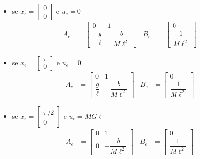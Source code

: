 \documentclass{article}
\numberwithin{equation}{subsection}
\begin{document}
\begin{itemize}
    \item se $x_e = \begin{bmatrix} 0\\0 \end{bmatrix}$ e $u_e = 0$
    \begin{align*}
        A_e &= 
        \begin{bmatrix}
            0 & 1\\
            -\dfrac{g}{\ell} & -\dfrac{b}{M \ell^2}
        \end{bmatrix} 
        &
        B_e &=
        \begin{bmatrix}
            0\\
            \dfrac{1}{M \ell^2}
        \end{bmatrix}
    \end{align*}
    \item se $x_e=\begin{bmatrix} \pi\\0 \end{bmatrix}$ e $u_e=0$
    \begin{align*}
        A_e &= 
        \begin{bmatrix}
            0 & 1\\
            \dfrac{g}{\ell} & -\dfrac{b}{M \ell^2}
        \end{bmatrix} 
        &
        B_e &=
        \begin{bmatrix}
            0\\
            \dfrac{1}{M \ell^2}
        \end{bmatrix}
    \end{align*}
    \item se $x_e=\begin{bmatrix} \pi/2 \\0 \end{bmatrix}$ e $u_e=MG\ell$
    \begin{align*}
        A_e &= 
        \begin{bmatrix}
            0 & 1\\
            0 & -\dfrac{b}{M \ell^2}
        \end{bmatrix} 
        &
        B_e &=
        \begin{bmatrix}
            0\\
            \dfrac{1}{M \ell^2}
        \end{bmatrix}
    \end{align*}
\end{itemize}
\end{document}
